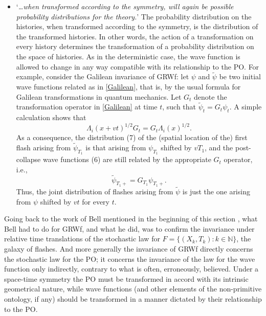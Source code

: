 \documentclass[12pt]{article}
\newcommand{\NNN}{\mathbb{N}}
\begin{document}
\begin{itemize}
\item `{\em\ldots  when transformed
according to the symmetry, will again be possible probability distributions for the theory.}' 
The probability distribution on the histories, when transformed according to the symmetry, is the distribution of the transformed histories. {In other words, the action of a transformation on every history determines the transformation of a probability distribution on the space of histories. As in the deterministic case,} the wave function is allowed to change in any way compatible with its relationship to the {PO}.   
For example, consider the Galilean invariance of {\sf GRWf}: 
let  $\psi$ and $\tilde{\psi}$ be two initial wave functions related as in \eqref{Galilean}, that is, by the usual formula for Galilean transformations in quantum mechanics. Let $G_t$ denote the transformation operator {in \eqref{Galilean}} at time $t$, such that $\tilde{\psi}_t = G_t \psi_t$. A simple calculation shows that
$$
\Lambda_i(x+vt)^{1/2} G_t = G_t \Lambda_i(x)^{1/2}.
$$
As a consequence, the distribution (7) of the {(spatial location of the)} first flash {arising} from $\tilde{\psi}_{T_1}$  is that {arising} from $\psi_{T_1}$ shifted by $vT_1$, and the post-collapse wave functions (6) are
still related by the appropriate $G_t$ operator, i.e.,
$$
\tilde{\psi}_{T_1+} = G_{T_1} \psi_{T_1+}.
$$
Thus, the joint distribution of flashes arising from $\tilde{\psi}$ is just the one arising from $\psi$ shifted by $vt$ for every $t$.
\end{itemize}

Going back to the work of Bell {mentioned in the beginning of this section \citep{Bell87}, what} Bell had to do for {\sf GRWf}, and what he did, was to confirm the invariance under relative time translations of the stochastic law for $F=\{(X_k,T_k):k \in \NNN\}$, the galaxy of flashes. And more generally the invariance of {\sf GRWf} directly concerns the stochastic law for the PO; 
it concerns the invariance of the law for the wave function only indirectly, contrary to what is  often, 
erroneously, believed. Under a space-time symmetry the PO must be transformed in accord with its intrinsic geometrical nature, while wave functions (and other elements of the non-primitive ontology, if any) should be transformed in a manner dictated by their relationship to the PO.
\end{document}
